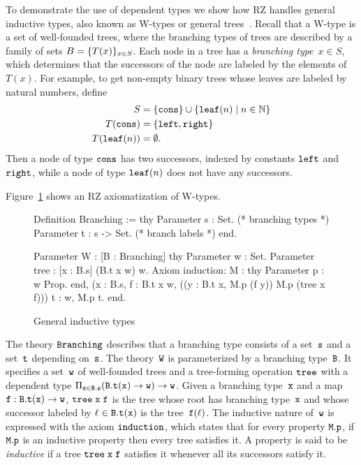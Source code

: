 To demonstrate the use of dependent types we show how RZ handles
general inductive types, also known as W-types or general
trees~\cite{nordstroem90:_progr_martin_type_theor}. Recall that a
W-type is a set of well-founded trees, where the branching types of
trees are described by a family of sets $B = \{T(x)\}_{x \in S}$.
Each node in a tree has a \emph{branching type}~$x \in S$, which
determines that the successors of the node are labeled by the elements
of~$T(x)$.
%
\iflong
%
For example, to get non-empty binary trees whose leaves are
labeled by natural numbers, define
%
\begin{align*}
  S &= \{\mathtt{cons}\} \cup \{\mathtt{leaf}(n) \mid n \in \mathbb{N}\}
  \\
  T(\mathtt{cons}) &= \{\mathtt{left}, \mathtt{right}\}
  \\
  T(\mathtt{leaf}(n)) &= \emptyset.
\end{align*}
%
Then a node of type $\mathtt{cons}$ has two successors, indexed by
constants $\mathtt{left}$ and $\mathtt{right}$, while a node of type
$\mathtt{leaf}(n)$ does not have any successors.
\par
%
\fi %
%
Figure~\ref{fig:wtype} shows an RZ axiomatization of W-types.
%
\begin{figure}
\begin{source}
Definition Branching :=
thy
  Parameter s : Set.      (* branching types *)
  Parameter t : s -> Set. (* branch labels *)
end.

Parameter W : [B : Branching] \iTo
thy
  Parameter w : Set.
  Parameter tree : [x : B.s] \iTo (B.t x \iTo w) \iTo w.
  Axiom induction:
    \iForall M : thy Parameter p : w \iTo Prop. end,
    (\iForall x : B.s, \iForall f : B.t x \iTo w,
       ((\iForall y : B.t x, M.p (f y)) \iTo M.p (tree x f))) \iTo
    \iForall t : w, M.p t.
end.
\end{source}
\vspace{-0.5cm}
  \caption{General inductive types}
  \label{fig:wtype}
\end{figure}
%
The theory $\mathtt{Branching}$ describes that a branching type
consists of a set~$\mathtt{s}$ and a set~$\mathtt{t}$ depending on~$\mathtt{s}$. The theory~$\mathtt{W}$ is
parameterized by a branching type~$\mathtt{B}$. It specifies a set~$\mathtt{w}$ of
well-founded trees and a tree-forming operation $\mathtt{tree}$ with a
dependent type $\Pi_{\mathtt{x} \in \mathtt{B.s}} (\mathtt{B.t(x)} \to \mathtt{w}) \to \mathtt{w}$.
%
\iflong
%
Given a
branching type~$\mathtt{x}$ and a map $\mathtt{f} : \mathtt{B.t(x)} \to \mathtt{w}$, $\mathtt{tree}\;\mathtt{x}\;\mathtt{f}$
is the tree whose root has branching type~$\mathtt{x}$ and whose successor
labeled by $\ell \in \mathtt{B.t}(\mathtt{x})$ is the tree~$\mathtt{f}(\ell)$.
%
\fi
%
The inductive nature of~$\mathtt{w}$ is expressed with the axiom
$\mathtt{induction}$, which states that for every property $\mathtt{M.p}$, if $\mathtt{M.p}$
is an inductive property then every tree satisfies it. A property is
said to be \emph{inductive} if a tree $\mathtt{tree}\;\mathtt{x}\;\mathtt{f}$ satisfies it
whenever all its successors satisfy it.

